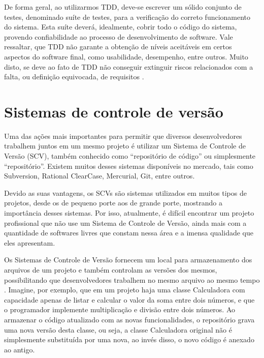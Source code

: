 De forma geral, ao utilizarmos TDD, deve-se escrever um sólido conjunto de testes, denominado suíte de testes, para a verificação do correto funcionamento do sistema. Esta suíte deverá, idealmente, cobrir todo o código do sistema, provendo confiabilidade ao processo de desenvolvimento de software. Vale ressaltar, que TDD não garante a obtenção de níveis aceitáveis em certos aspectos do software final, como usabilidade, desempenho, entre outros. Muito disto, se deve ao fato de TDD não conseguir extinguir riscos relacionados com a falta, ou definição equivocada, de requisitos \cite{RIBEIRO}.

\section{Sistemas de controle de versão}

Uma das ações mais importantes para permitir que diversos desenvolvedores trabalhem juntos em um mesmo projeto é utilizar um Sistema de Controle de Versão (SCV), também conhecido como ``repositório de código'' ou simplesmente ``repositório''. Existem muitos desses sistemas disponíveis no mercado, tais como Subversion, Rational ClearCase, Mercurial, Git, entre outros.

Devido as suas vantagens, os SCVs são sistemas utilizados em muitos tipos de projetos, desde os de pequeno porte aos de grande porte, mostrando a importância desses sistemas. Por isso, atualmente, é difícil encontrar um projeto profissional que não use um Sistema de Controle de Versão, ainda mais com a quantidade de softwares livres que constam nessa área e a imensa qualidade que eles apresentam.

Os Sistemas de Controle de Versão fornecem um local para armazenamento dos arquivos de um projeto e também controlam as versões dos mesmos, possibilitando que desenvolvedores trabalhem no mesmo arquivo ao mesmo tempo \cite{SHORE}. Imagine, por exemplo, que em um projeto haja uma classe Calculadora com capacidade apenas de listar e calcular o valor da soma entre dois números, e que o programador implemente multiplicação e divisão entre dois números. Ao armazenar o código atualizado com as novas funcionalidades, o repositório grava uma nova versão desta classe, ou seja, a classe Calculadora original não é simplesmente substituída por uma nova, ao invés disso, o novo código é anexado ao antigo.

